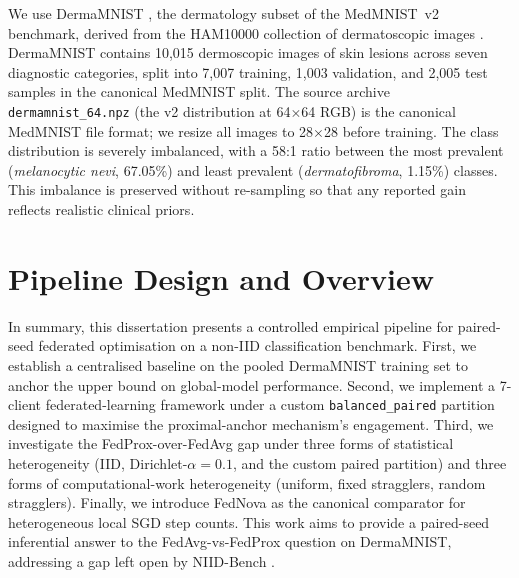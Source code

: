 \documentclass[11pt,a4paper]{report}  %
\begin{document}

We use DermaMNIST \citep{yang2023medmnistv2}, the dermatology subset of
the MedMNIST~v2 benchmark, derived from the HAM10000 collection of
dermatoscopic images \citep{tschandl2018ham10000}. DermaMNIST contains
10{,}015 dermoscopic images of skin lesions across seven diagnostic
categories, split into 7{,}007 training, 1{,}003 validation, and 2{,}005
test samples in the canonical MedMNIST split. The source archive
\texttt{dermamnist\_64.npz} (the v2 distribution at 64$\times$64 RGB) is
the canonical MedMNIST file format; we resize all images to
28$\times$28 before training. The class distribution is severely
imbalanced, with a 58:1 ratio between the most prevalent
(\textit{melanocytic nevi}, 67.05\%) and least prevalent
(\textit{dermatofibroma}, 1.15\%) classes. This imbalance is preserved
without re-sampling so that any reported gain reflects realistic
clinical priors.


\section{Pipeline Design and Overview}
\label{sec:pipeline}


In summary, this dissertation presents a controlled empirical pipeline
for paired-seed federated optimisation on a non-IID classification
benchmark. First, we establish a centralised baseline on the pooled
DermaMNIST training set to anchor the upper bound on global-model
performance. Second, we implement a 7-client federated-learning
framework under a custom \texttt{balanced\_paired} partition designed
to maximise the proximal-anchor mechanism's engagement. Third, we
investigate the FedProx-over-FedAvg gap under three forms of
statistical heterogeneity (IID, Dirichlet-$\alpha = 0.1$, and the
custom paired partition) and three forms of computational-work
heterogeneity (uniform, fixed stragglers, random stragglers). Finally,
we introduce FedNova \citep{wang2020fednova} as the canonical
comparator for heterogeneous local SGD step counts. This work aims to
provide a paired-seed inferential answer to the FedAvg-vs-FedProx
question on DermaMNIST, addressing a gap left open by NIID-Bench
\citep{li2022niidbench}.
\end{document}
